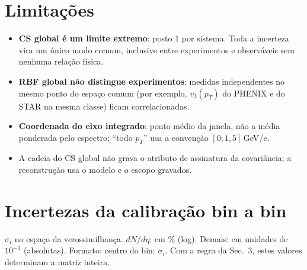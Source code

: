 \documentclass[11pt,a4paper]{article}
\begin{document}
\section{Limitações}\label{sec:lim}
\begin{itemize}[nosep]
\item \textbf{CS global é um limite extremo}: posto 1 por sistema. Toda a incerteza vira um único modo comum, inclusive
entre experimentos e observáveis sem nenhuma relação física.
\item \textbf{RBF global não distingue experimentos}: medidas independentes no mesmo ponto do espaço comum (por exemplo,
$v_2(p_T)$ do PHENIX e do STAR na mesma classe) ficam correlacionadas.
\item \textbf{Coordenada do eixo integrado}: ponto médio da janela, não a média ponderada pelo espectro; ``todo $p_T$''
usa a convenção $[0;1{,}5]$\,GeV/$c$.
\item A cadeia do CS global não grava o atributo de assinatura da covariância; a
reconstrução usa o modelo e o escopo gravados.
\end{itemize}

\appendix
\section{Incertezas da calibração bin a bin}\label{ap:sigma}
$\sigma_i$ no espaço da verossimilhança. $dN/d\eta$: em \% (log). Demais: em unidades de $10^{-3}$ (absolutas). Formato:
centro do bin: $\sigma_i$. Com a regra da Sec.~3, estes valores determinam a matriz inteira.
\par\medskip
{\scriptsize{}}
\end{document}
